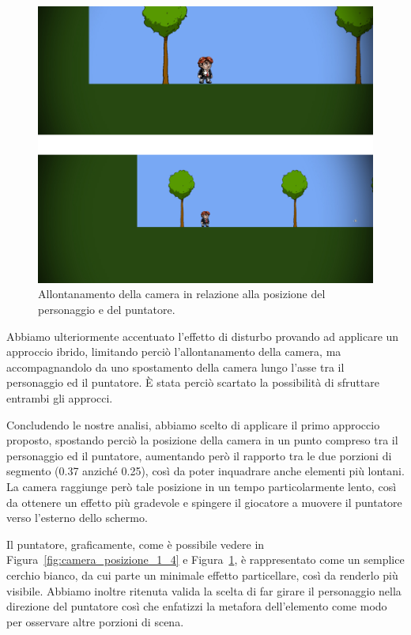 \begin{figure}%
	\centering
	\includegraphics[width= 0.85\columnwidth]{images/gameDesign/16.jpg}
	\caption{Allontanamento della camera in relazione alla posizione del personaggio e del puntatore.}
	\label{fig:camera_allontanamento}
\end{figure}

Abbiamo ulteriormente accentuato l’effetto di disturbo provando ad applicare un approccio ibrido, limitando perciò l’allontanamento della camera, ma accompagnandolo da uno spostamento della camera lungo l’asse tra il personaggio ed il puntatore. È stata perciò scartato la possibilità di sfruttare entrambi gli approcci.

Concludendo le nostre analisi, abbiamo scelto di applicare il primo approccio proposto, spostando perciò la posizione della camera in un punto compreso tra il personaggio ed il puntatore, aumentando però il rapporto tra le due porzioni di segmento (0.37 anziché 0.25), così da poter inquadrare anche elementi più lontani. La camera raggiunge però tale posizione in un tempo particolarmente lento, così da ottenere un effetto più gradevole e spingere il giocatore a muovere il puntatore verso l’esterno dello schermo.

Il puntatore, graficamente, come è possibile vedere in Figura~\ref{fig:camera_posizione_1_4} e Figura~\ref{fig:camera_allontanamento}, è rappresentato come un semplice cerchio bianco, da cui parte un minimale effetto particellare, così da renderlo più visibile.
Abbiamo inoltre ritenuta valida la scelta di far girare il personaggio nella direzione del puntatore così che enfatizzi la metafora dell’elemento come modo per osservare altre porzioni di scena.

